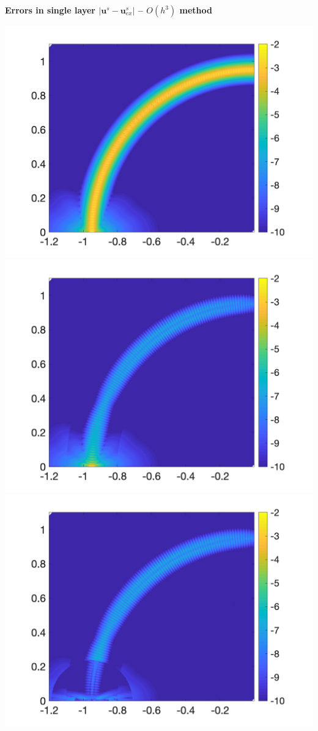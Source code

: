  

\centerline{\textbf{\Large Errors in single layer $|\mathbf{u}^s-\mathbf{u}^s_{ex}|$ -- $O(h^3)$ method}}
\bigskip
\noindent
\includegraphics[trim=40 20 40 10, clip, width=2.5truein]{figs/fig100a} 
\includegraphics[trim=40 20 40 10, clip, width=2.5truein]{figs/fig100b} 
\includegraphics[trim=40 20 40 10, clip, width=2.5truein]{figs/fig100c} \\
